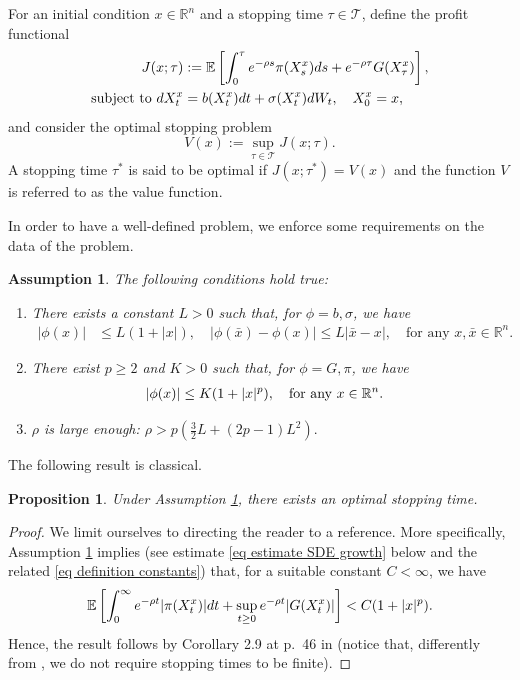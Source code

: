 \documentclass[11pt]{amsart}
\newtheorem{assumption}[theorem]{Assumption}
\newtheorem{proposition}[theorem]{Proposition}
\theoremstyle{plain}
\def \dd{{\rm d}}
\def \R{\mathbb{R}}
\numberwithin{equation}{section}
\begin{document}
For an initial condition $x \in \R^n$ and a stopping time $\tau \in \mathcal T$, define the profit functional
$$
\begin{aligned}
J(x;\tau) & := \mathbb{E}\left[\int_{0}^{\tau} e^{- \rho s} \pi (X^x_{s}) \dd s +e ^{- \rho \tau} G(X^x_{\tau})\right], \\
 \text{subject to } \dd X^x_{t} & =b(X^x_{t}) \dd t+\sigma(X^x_{t}) \dd W_{t}, \quad X^x_{0}=x, 
\end{aligned} 
$$
and consider the optimal stopping problem
\begin{equation}\label{eq:value_classic_os}
    V(x) :=  \sup _{\tau \in \mathcal T}  J(x;\tau).
\end{equation}
A stopping time $\tau^*$ is said to be optimal if $J(x;\tau^*) =V(x)$ and the function $V$ is referred to as the value function.

In order to have a well-defined problem, we enforce some requirements on the data of the problem. 
\begin{assumption}
    \label{assumption first}
    The following conditions hold true: 
    \begin{enumerate}
    \item\label{assumption first: condition b sigma} There exists a constant $L>0$ such that, for $\phi = b, \sigma$, we have
    $$ \begin{aligned}
         | \phi (x)| & \leq L (1+|x|),\quad  
        |\phi (\bar x) - \phi (x)|  \leq L |\bar x - x|, \quad \text{for any $x, \bar x \in \mathbb R ^n$}.
    \end{aligned}
    $$ 
    \item\label{assumption first: condition costs} There exist $p\geq 2$ and $K>0$ such that, for $\phi = G, \pi$, we have
    $$
    \begin{aligned}
    |\phi(x)| &\leq K (1+|x|^p), \quad \text{for any $ x \in \mathbb R ^n$}. 
    \end{aligned}
    $$
    \item\label{assumption first: condition rho} $\rho$ is large enough: 
    $
    \rho >  p (\frac32 L + (2p-1) L^2 ). 
    $
    \end{enumerate}
\end{assumption}
The following result is classical.  
\begin{proposition} 
 Under Assumption \ref{assumption first}, there exists an optimal stopping time. 
\end{proposition}
\begin{proof}
We limit ourselves to directing the reader to a reference. More specifically,  Assumption \ref{assumption first} implies (see estimate \eqref{eq estimate SDE growth} below and the related \eqref{eq definition constants}) that, for a suitable constant $C<\infty$, we have
$$
\mathbb E \left[ \int_0^\infty e^{-\rho t} |\pi(X^x_t)| \dd t + \sup_{t\geq 0} e^{-\rho t} |G(X^x_t)| \right] < C(1+|x|^p).
$$ 
Hence, the result follows by Corollary 2.9 at p.\ 46 in \cite{peskir.shiryav.2006optimal} (notice that, differently from \cite{peskir.shiryav.2006optimal}, we do not require stopping times to be finite).
\end{proof}
 
\end{document}
